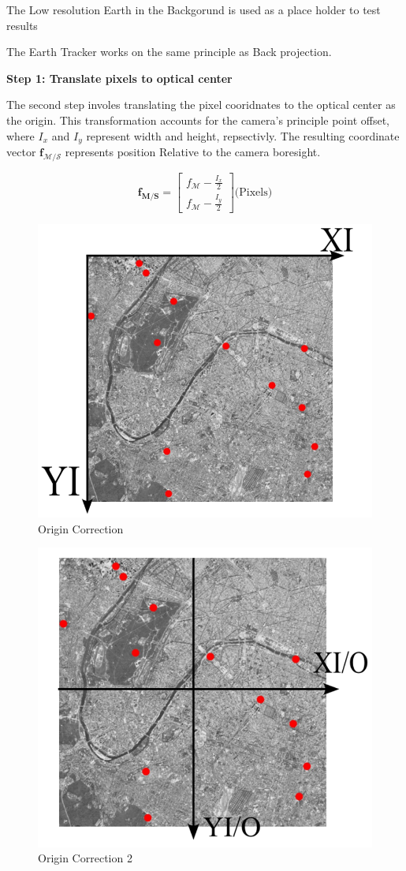 The Low resolution Earth in the Backgorund is used as a place holder to test results


The Earth Tracker works on the same principle as Back projection.

\textbf{Step 1: Translate pixels to optical center}

The second step involes translating the pixel cooridnates to the optical center as the origin. This transformation accounts for the camera's principle point
offset, where $I_x$ and $I_y$ represent width and height, repsectivly. The resulting coordinate vector $\mathbf{f}_{\mathcal{M/S}}$ represents position Relative
to the camera boresight.

\begin{equation}
    \mathbf{f}_{\mathbf{M/S}} = 
    \begin{bmatrix}
        f_\mathcal{M} - \frac{I_x}{2} \\
        f_\mathcal{M} - \frac{I_y}{2}
    \end{bmatrix}
    \text{(Pixels)}
\end{equation}

\begin{figure}[H]
    \centering
    \includegraphics[width=0.5\linewidth]{figures/imageprocessing/IMG1.png}
    \caption{Origin Correction}
    \label{}
\end{figure}

\begin{figure}[H]
    \centering
    \includegraphics[width=0.5\linewidth]{figures/imageprocessing/IMG2.png}
    \caption{Origin Correction 2}
    \label{}
\end{figure}

